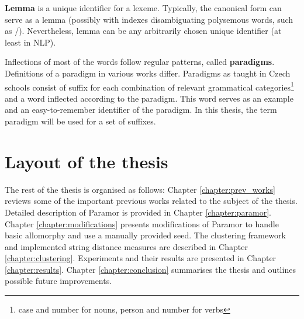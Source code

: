 \textbf{Lemma} is a unique identifier for a lexeme. Typically, the canonical form can serve as a lemma (possibly with indexes disambiguating polysemous words, such as /). Nevertheless, lemma can be any arbitrarily chosen unique identifier (at least in NLP).

Inflections of most of the words follow regular patterns, called \textbf{paradigms}. Definitions of a paradigm in various works differ. Paradigms as taught in Czech schools consist of suffix for each combination of relevant grammatical categories\footnote{case and number for nouns, person and number for verbs} and a word inflected according to the paradigm. This word serves as an example and an easy-to-remember identifier of the paradigm. In this thesis, the term paradigm will be used for a set of suffixes. 

\section{Layout of the thesis}
The rest of the thesis is organised as follows: Chapter \ref{chapter:prev_works} reviews some of the important previous works related to the subject of the thesis. Detailed description of Paramor is provided in Chapter \ref{chapter:paramor}. Chapter \ref{chapter:modifications} presents modifications of Paramor to handle basic allomorphy and use a manually provided seed. The clustering framework and implemented string distance measures are described in Chapter \ref{chapter:clustering}. Experiments and their results are presented in Chapter \ref{chapter:results}. Chapter \ref{chapter:conclusion} summarises the thesis and outlines possible future improvements. 

